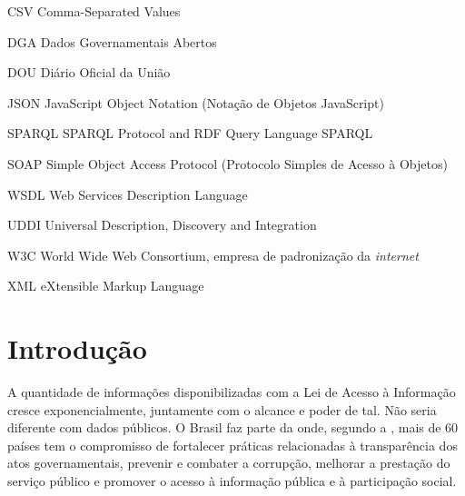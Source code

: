 \documentclass[
	12pt,				%
	openright,			%
	twoside,			%
	a4paper,			%
	english,			%
	french,				%
	spanish,			%
	brazil				%
	]{abntex2}
\begin{document}
\begin{siglas}
  \item[CSV] Comma-Separated Values
  \item[DGA] Dados Governamentais Abertos
  \item[DOU] Diário Oficial da União
  \item[JSON] JavaScript Object Notation (Notação de Objetos JavaScript)
  \item[SPARQL] SPARQL Protocol and RDF Query Language SPARQL
  \item[SOAP] Simple Object Access Protocol (Protocolo Simples de Acesso à Objetos)
  \item[WSDL] Web Services Description Language
  \item[UDDI] Universal Description, Discovery and Integration
  \item[W3C] World Wide Web Consortium, empresa de padronização da \emph{internet}
  \item[XML] eXtensible Markup Language
\end{siglas}


\tableofcontents*
\cleardoublepage



\textual

\chapter[Introdução]{Introdução}

A quantidade de informações disponibilizadas com a Lei de Acesso à Informação cresce exponencialmente, juntamente com o alcance
e poder de tal. 
Não seria diferente com dados públicos. O Brasil faz parte da  onde, segundo a , mais 
de 60 países tem o compromisso de fortalecer práticas relacionadas à transparência dos atos governamentais, prevenir e 
combater a corrupção, melhorar a prestação do serviço público e promover o acesso à informação pública e à participação social.
\end{document}
